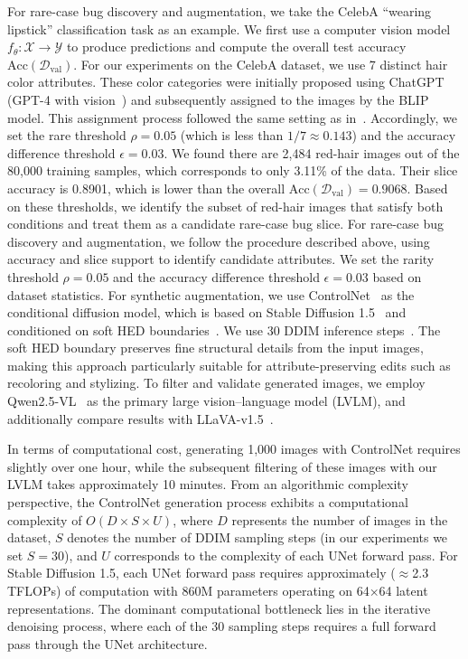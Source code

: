 \documentclass[10pt]{article} %
\newcommand{\controlnet}{ControlNet\xspace}
\newcommand{\qwen}{Qwen2.5-VL\xspace}
\newcommand{\llava}{LLaVA-v1.5\xspace}
\begin{document}
For rare-case bug discovery and augmentation, we take the CelebA “wearing lipstick” classification task as an example. We first use a computer vision model \(f_\theta\colon \mathcal{X}\to\mathcal{Y}\) to produce predictions and compute the overall test accuracy \(\mathrm{Acc}(\mathcal{D}_{\mathrm{val}})\). 
For our experiments on the CelebA dataset, we use 7 distinct hair color attributes. These color categories were initially proposed using ChatGPT (GPT-4 with vision~\citep{openai2023gpt4}) and subsequently assigned to the images by the BLIP~\citep{li2022blip} model. This assignment process followed the same setting as in~\citep{chen2023hibug}. Accordingly, we set the rare threshold \(\rho = 0.05\) (which is less than \(1/7 \approx 0.143\)) and the accuracy difference threshold \(\epsilon = 0.03\). We found there are 2{,}484 red-hair images out of the 80{,}000 training samples, which corresponds to only 3.11\% of the data. Their slice accuracy is 0.8901, which is lower than the overall \(\mathrm{Acc}(\mathcal{D}_{\mathrm{val}}) = 0.9068\). Based on these thresholds, we identify the subset of red-hair images that satisfy both conditions and treat them as a candidate rare-case bug slice.
For rare-case bug discovery and augmentation, we follow the procedure described above, using accuracy and slice support to identify candidate attributes. We set the rarity threshold \(\rho = 0.05\) and the accuracy difference threshold \(\epsilon = 0.03\) based on dataset statistics. For synthetic augmentation, we use \controlnet~\citep{zhang2023adding} as the conditional diffusion model, which is based on Stable Diffusion 1.5~\citep{rombach2022high} and conditioned on soft HED boundaries~\citep{xie2015holistically}. We use 30 DDIM inference steps~\citep{song2021ddim}. The soft HED boundary preserves fine structural details from the input images, making this approach particularly suitable for attribute-preserving edits such as recoloring and stylizing. To filter and validate generated images, we employ \qwen~\citep{bai2025qwen25vl} as the primary large vision--language model (LVLM), and additionally compare results with \llava~\citep{liu2023improvedllava}.

In terms of computational cost, generating 1,000 images with ControlNet requires slightly over one hour, while the subsequent filtering of these images with our LVLM takes approximately 10 minutes. From an algorithmic complexity perspective, the ControlNet generation process exhibits a computational complexity of $O(D \times S \times U)$, where $D$ represents the number of images in the dataset, $S$ denotes the number of DDIM sampling steps (in our experiments we set $S=30$), and $U$ corresponds to the complexity of each UNet forward pass. For Stable Diffusion 1.5, each UNet forward pass requires approximately (\(\approx\)2.3 TFLOPs) of computation with 860M parameters operating on 64×64 latent representations. The dominant computational bottleneck lies in the iterative denoising process, where each of the 30 sampling steps requires a full forward pass through the UNet architecture. 
\end{document}
